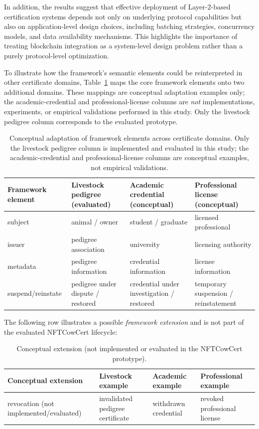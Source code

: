 \documentclass[pdflatex,sn-mathphys-num]{sn-jnl}
\begin{document}
In addition, the results suggest that effective deployment of Layer-2-based certification systems depends not only on underlying protocol capabilities but also on application-level design choices, including batching strategies, concurrency models, and data availability mechanisms. This highlights the importance of treating blockchain integration as a system-level design problem rather than a purely protocol-level optimization.

To illustrate how the framework's semantic elements could be reinterpreted in other certificate domains, Table~\ref{tab:conceptual-adaptation} maps the core framework elements onto two additional domains. These mappings are conceptual adaptation examples only; the academic-credential and professional-license columns are \emph{not} implementations, experiments, or empirical validations performed in this study. Only the livestock pedigree column corresponds to the evaluated prototype.

\begin{table}[!htbp]
\centering
\caption{Conceptual adaptation of framework elements across certificate domains. Only the livestock pedigree column is implemented and evaluated in this study; the academic-credential and professional-license columns are conceptual examples, not empirical validations.}
\label{tab:conceptual-adaptation}
\begin{tabular}{@{}llll@{}}
\toprule
\textbf{Framework element} & \textbf{Livestock pedigree (evaluated)} & \textbf{Academic credential (conceptual)} & \textbf{Professional license (conceptual)} \\
\midrule
subject & animal / owner & student / graduate & licensed professional \\
issuer & pedigree association & university & licensing authority \\
metadata & pedigree information & credential information & license information \\
suspend/reinstate & pedigree under dispute / restored & credential under investigation / restored & temporary suspension / reinstatement \\
\bottomrule
\end{tabular}
\end{table}

The following row illustrates a possible \emph{framework extension} and is not part of the evaluated NFTCowCert lifecycle:

\begin{table}[!htbp]
\centering
\caption{Conceptual extension (not implemented or evaluated in the NFTCowCert prototype).}
\label{tab:conceptual-extension}
\begin{tabular}{@{}llll@{}}
\toprule
\textbf{Conceptual extension} & \textbf{Livestock example} & \textbf{Academic example} & \textbf{Professional example} \\
\midrule
revocation (not implemented/evaluated) & invalidated pedigree certificate & withdrawn credential & revoked professional license \\
\bottomrule
\end{tabular}
\end{table}
\end{document}
